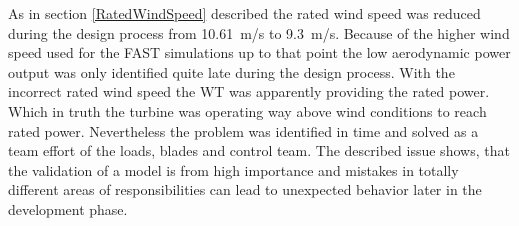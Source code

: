 As in section \ref{RatedWindSpeed} described the rated wind speed was reduced during the design process from \SI{10.61}{m/s} to \SI{9.3}{m/s}.
Because of the higher wind speed used for the FAST simulations up to that point the low aerodynamic power output was only identified quite late during the design process.
With the incorrect rated wind speed the WT was apparently providing the rated power.
Which in truth the turbine was operating way above wind conditions to reach rated power.
Nevertheless the problem was identified in time and solved as a team effort of the loads, blades and control team. 
The described issue shows, that the validation of a model is from high importance and mistakes in totally different areas of responsibilities can lead to unexpected behavior later in the development phase. 
 